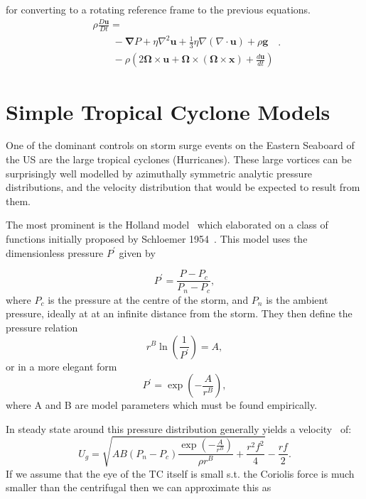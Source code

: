 for converting to a rotating reference frame to the previous equations.
\begin{equation}
\begin{array}{l}
\rho \frac{D \mathbf{u}}{D t}=\\\quad\quad-\boldsymbol{\nabla} P+
\eta \nabla^{2} \mathbf{u}+\frac{1}{3} \eta \nabla(\nabla \cdot \mathbf{u})
+\rho \mathbf{g}\\\quad\quad-\rho\left(2 \mathbf{\Omega} \times \mathbf{u}
+\mathbf{\Omega} \times(\mathbf{\Omega} \times \mathbf{x})
+\frac{d \mathbf{u}}{d t}\right)\end{array}.
\tag{R-Momentum}
\end{equation}



\section{Simple Tropical Cyclone Models}

One of the dominant controls on storm surge events on the Eastern Seaboard
 of the US are the large tropical cyclones (Hurricanes).
  These large vortices can be surprisingly well modelled by azimuthally
   symmetric analytic pressure distributions, and the velocity distribution
    that would be expected to result from them.

The most prominent is the  Holland model~\cite{holland1980analytic,holland2010revised}
 which elaborated on a class of functions initially proposed by Schloemer 1954~\cite{schloemer1954analysis}.
  This model uses the dimensionless pressure \( P^{\prime}\) given by

\begin{equation}
    P^{\prime}=\dfrac{P-P_{c}}{P_{n}-P_{c}},
\end{equation}
where $P_c$ is the pressure at the centre of the storm, and $P_n$ is the ambient pressure, ideally at at an infinite distance from the storm. They then define the pressure relation
\begin{equation}
    r^{B}\ln(\frac{1}{P^{\prime}})=A,
\end{equation}or in a more elegant form
\begin{equation}
P^{\prime}=\exp{(-\frac{A}{r^B})},
\end{equation}
where A and B are model parameters which must be found empirically.

In steady state around this  pressure distribution generally yields a
 velocity~\cite{roisin2010GFD} of:
\begin{equation}
    U_g = \sqrt{AB(P_{n} - P_{c})\frac{\exp{(-\frac{A}{r^{B}})}}{\rho r^{B}}
     +\frac{r^2f^2}{4}}-\frac{rf}{2}.
\end{equation}
If we assume that the eye of the TC itself is small s.t. the Coriolis force
 is much smaller than the centrifugal then we can approximate this as

